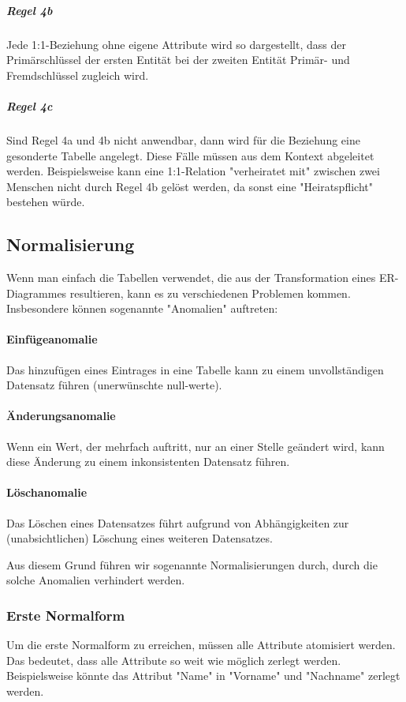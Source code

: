 \documentclass{article}
\begin{document}
	\subparagraph{Regel 4b}
	Jede 1:1-Beziehung ohne eigene Attribute wird so dargestellt, dass der Primärschlüssel der ersten Entität bei der zweiten Entität Primär- und Fremdschlüssel zugleich wird.

	\subparagraph{Regel 4c}
	Sind Regel 4a und 4b nicht anwendbar, dann wird für die Beziehung eine gesonderte Tabelle angelegt. Diese Fälle müssen aus dem Kontext abgeleitet werden.
	Beispielsweise kann eine 1:1-Relation "verheiratet mit" zwischen zwei Menschen nicht durch Regel 4b gelöst werden, da sonst eine "Heiratspflicht" bestehen würde.

	\subsection{Normalisierung}
	Wenn man einfach die Tabellen verwendet, die aus der Transformation eines ER-Diagrammes resultieren, kann es zu verschiedenen Problemen kommen. Insbesondere können sogenannte "Anomalien" auftreten:

	\paragraph{Einfügeanomalie}
	Das hinzufügen eines Eintrages in eine Tabelle kann zu einem unvollständigen Datensatz führen (unerwünschte null-werte).

	\paragraph{Änderungsanomalie}
	Wenn ein Wert, der mehrfach auftritt, nur an einer Stelle geändert wird, kann diese Änderung zu einem inkonsistenten Datensatz führen.

	\paragraph{Löschanomalie}
	Das Löschen eines Datensatzes führt aufgrund von Abhängigkeiten zur (unabsichtlichen) Löschung eines weiteren Datensatzes.

	Aus diesem Grund führen wir sogenannte Normalisierungen durch, durch die solche Anomalien verhindert werden.

	\subsubsection{Erste Normalform}
	Um die erste Normalform zu erreichen, müssen alle Attribute atomisiert werden. Das bedeutet, dass alle Attribute so weit wie möglich zerlegt werden.
	Beispielsweise könnte das Attribut "Name" in "Vorname" und "Nachname" zerlegt werden.
\end{document}
